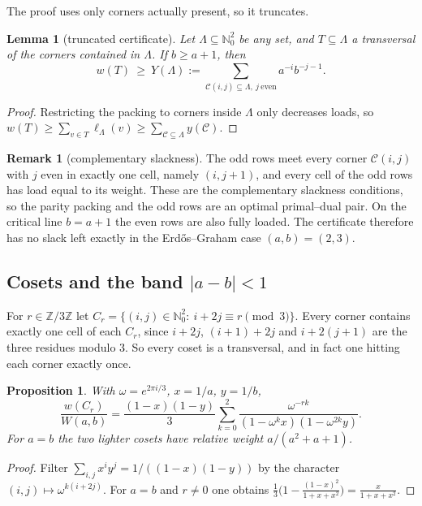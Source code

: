 \documentclass[11pt]{amsart}
\newtheorem{proposition}[theorem]{Proposition}
\newtheorem{lemma}[theorem]{Lemma}
\theoremstyle{definition}
\newtheorem{remark}[theorem]{Remark}
\newcommand{\N}{\mathbb{N}}
\newcommand{\Z}{\mathbb{Z}}
\newcommand{\Cor}{\mathcal{C}}
\begin{document}
The proof uses only corners actually present, so it truncates.

\begin{lemma}[truncated certificate]\label{lem:trunc}
Let $\Lambda\subseteq\N_0^2$ be any set, and $T\subseteq\Lambda$ a transversal of the corners contained in $\Lambda$. If $b\ge a+1$, then
\[
w(T)\ \ge\ Y(\Lambda):=\sum_{\Cor(i,j)\subseteq\Lambda,\ j\ \text{even}} a^{-i}b^{-j-1}.
\]
\end{lemma}

\begin{proof}
Restricting the packing to corners inside $\Lambda$ only decreases loads, so $w(T)\ge\sum_{v\in T}\ell_\Lambda(v)\ge\sum_{\Cor\subseteq\Lambda}y(\Cor)$.
\end{proof}

\begin{remark}[complementary slackness]\label{rem:slack}
The odd rows meet every corner $\Cor(i,j)$ with $j$ even in exactly one cell, namely $(i,j+1)$, and every cell of the odd rows has load equal to its weight. These are the complementary slackness conditions, so the parity packing and the odd rows are an optimal primal--dual pair. On the critical line $b=a+1$ the even rows are also fully loaded. The certificate therefore has no slack left exactly in the Erd\H{o}s--Graham case $(a,b)=(2,3)$.
\end{remark}

\subsection{Cosets and the band \texorpdfstring{$|a-b|<1$}{|a-b|<1}}
For $r\in\Z/3\Z$ let $C_r=\{(i,j)\in\N_0^2:\ i+2j\equiv r\pmod 3\}$. Every corner contains exactly one cell of each $C_r$, since $i+2j$, $(i+1)+2j$ and $i+2(j+1)$ are the three residues modulo $3$. So every coset is a transversal, and in fact one hitting each corner exactly once.

\begin{proposition}\label{prop:cosetweight}
With $\omega=e^{2\pi i/3}$, $x=1/a$, $y=1/b$,
\[
\frac{w(C_r)}{W(a,b)}=\frac{(1-x)(1-y)}3\sum_{k=0}^{2}\frac{\omega^{-rk}}{(1-\omega^kx)(1-\omega^{2k}y)} .
\]
For $a=b$ the two lighter cosets have relative weight $a/(a^2+a+1)$.
\end{proposition}

\begin{proof}
Filter $\sum_{i,j}x^iy^j=1/((1-x)(1-y))$ by the character $(i,j)\mapsto\omega^{k(i+2j)}$. For $a=b$ and $r\ne0$ one obtains $\tfrac13\bigl(1-\frac{(1-x)^2}{1+x+x^2}\bigr)=\frac{x}{1+x+x^2}$.
\end{proof}
\end{document}
